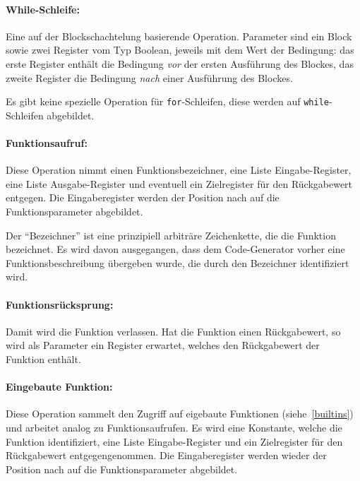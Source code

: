 \documentclass[twoside,a4paper,fleqn,12pt]{article}
\begin{document}

\paragraph{While-Schleife:} Eine auf der Blockschachtelung basierende Operation. Parameter sind ein Block sowie zwei Register vom
Typ Boolean, jeweils mit dem Wert der Bedingung: das erste Register enthält die Bedingung \emph{vor} der ersten Ausführung des Blockes,
das zweite Register die Bedingung \emph{nach} einer Ausführung des Blockes.

Es gibt keine spezielle Operation für \texttt{for}-Schleifen, diese werden auf \texttt{while}-Schleifen abgebildet.

\paragraph{Funktionsaufruf:} Diese Operation nimmt einen Funktionsbezeichner, eine Liste Eingabe-Register, eine Liste Ausgabe-Register
und eventuell ein Zielregister für den Rückgabewert entgegen. Die Eingaberegister werden der Position nach auf die Funktionsparameter abgebildet.

Der "`Bezeichner"' ist eine prinzipiell arbiträre Zeichenkette, die die Funktion bezeichnet. Es wird davon ausgegangen, dass dem Code-Generator
vorher eine Funktionsbeschreibung übergeben wurde, die durch den Bezeichner identifiziert wird.

\paragraph{Funktionsrücksprung:} Damit wird die Funktion verlassen. Hat die Funktion einen Rückgabewert, so wird als Parameter ein Register
erwartet, welches den Rückgabewert der Funktion enthält.

\paragraph{Eingebaute Funktion:} Diese Operation sammelt den Zugriff auf eigebaute Funktionen (siehe~\ref{builtins})
und arbeitet analog zu Funktionsaufrufen. Es wird eine Konstante, welche die Funktion identifiziert, eine Liste Eingabe-Register 
und ein Zielregister für den Rückgabewert entgegengenommen. Die Eingaberegister werden wieder der Position nach auf die Funktionsparameter abgebildet.

\end{document}
